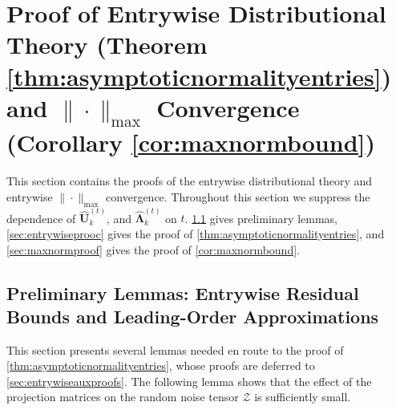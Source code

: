 \documentclass[10pt]{article}
\newcommand{\0}{{\mathbf{0}}}
\newcommand{\1}{{\mathbf{1}}}
\newcommand{\uhat}{\mathbf{\hat{U}}}
\renewcommand{\hat}{\widehat}
\renewcommand{\hat}{\widehat}
\begin{document}
 
 
 \section{Proof of Entrywise Distributional Theory (Theorem \ref{thm:asymptoticnormalityentries}) and $\|\cdot\|_{\max}$ Convergence (Corollary \ref{cor:maxnormbound})}
\label{sec:entrywisedistributionaltheoryproofs}
This section contains the proofs of the entrywise distributional theory and entrywise $\|\cdot\|_{\max}$ convergence.  Throughout this section we suppress the dependence of $\uhat_k^{(t)}$,  and $\mathbf{\hat{\Lambda}}_k^{(t)}$ on $t$.  \cref{sec:entrywiseaux} gives preliminary lemmas, \cref{sec:entrywiseprooc} gives the proof of \cref{thm:asymptoticnormalityentries},
 and \cref{sec:maxnormproof} gives the proof of \cref{cor:maxnormbound}. %

 \subsection{Preliminary Lemmas: Entrywise Residual Bounds and Leading-Order Approximations}
 \label{sec:entrywiseaux}
 This section presents several lemmas needed en route to the proof of \cref{thm:asymptoticnormalityentries}, whose proofs are deferred to \cref{sec:entrywiseauxproofs}.  
The following lemma shows that the effect of the projection matrices on the random noise tensor $\mathcal{Z}$ is sufficiently small.
\end{document}
